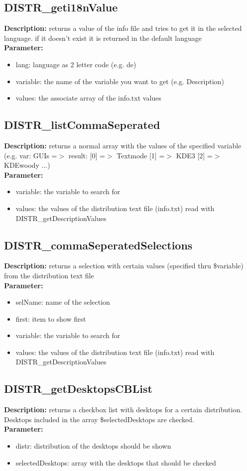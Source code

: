 \subsection{DISTR\_geti18nValue}
\textbf{Description:} returns a value of the info file and tries to get it in the selected language. if it doesn't exist it is returned in the default language\\
\textbf{Parameter:}
\begin{itemize}
\item lang: language as 2 letter code (e.g. de)
\item variable: the name of the variable you want to get (e.g. Description)
\item values: the associate array of the info.txt values
\end{itemize}

\subsection{DISTR\_listCommaSeperated}
\textbf{Description:} returns a normal array with the values of the specified variable (e.g. var: GUIs =$>$ result: [0] =$>$ Textmode [1] =$>$ KDE3 [2] =$>$ KDEwoody ...)\\
\textbf{Parameter:}
\begin{itemize}
\item variable: the variable to search for
\item values: the values of the distribution text file (info.txt) read with DISTR\_getDescriptionValues
\end{itemize}

\subsection{DISTR\_commaSeperatedSelections}
\textbf{Description:} returns a selection with certain values (specified thru \$variable) from the distribution text file\\
\textbf{Parameter:}
\begin{itemize}
\item selName: name of the selection
\item first: item to show first
\item variable: the variable to search for
\item values: the values of the distribution text file (info.txt) read with DISTR\_getDescriptionValues
\end{itemize}

\subsection{DISTR\_getDesktopsCBList}
\textbf{Description:} returns a checkbox list with desktops for a certain distribution. Desktops included in the array \$selectedDesktops are checked.\\
\textbf{Parameter:}
\begin{itemize}
\item distr: distribution of the desktops should be shown
\item selectedDesktops: array with the desktops that should be checked
\end{itemize}

